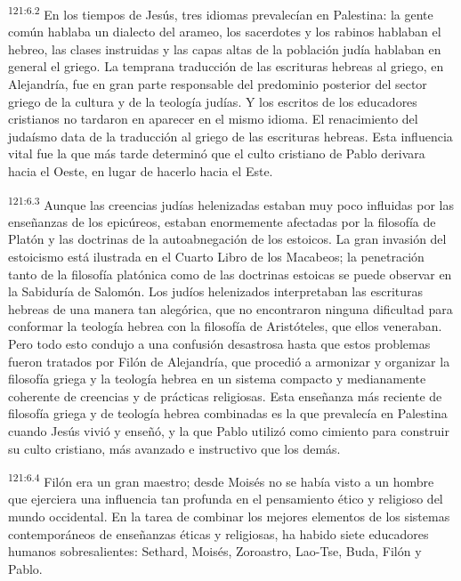 \par 
\textsuperscript{121:6.2} En los tiempos de Jesús, tres idiomas prevalecían en Palestina: la gente común hablaba un dialecto del arameo, los sacerdotes y los rabinos hablaban el hebreo, las clases instruidas y las capas altas de la población judía hablaban en general el griego. La temprana traducción de las escrituras hebreas al griego, en Alejandría, fue en gran parte responsable del predominio posterior del sector griego de la cultura y de la teología judías. Y los escritos de los educadores cristianos no tardaron en aparecer en el mismo idioma. El renacimiento del judaísmo data de la traducción al griego de las escrituras hebreas. Esta influencia vital fue la que más tarde determinó que el culto cristiano de Pablo derivara hacia el Oeste, en lugar de hacerlo hacia el Este.

\par 
\textsuperscript{121:6.3} Aunque las creencias judías helenizadas estaban muy poco influidas por las enseñanzas de los epicúreos, estaban enormemente afectadas por la filosofía de Platón y las doctrinas de la autoabnegación de los estoicos. La gran invasión del estoicismo está ilustrada en el Cuarto Libro de los Macabeos; la penetración tanto de la filosofía platónica como de las doctrinas estoicas se puede observar en la Sabiduría de Salomón. Los judíos helenizados interpretaban las escrituras hebreas de una manera tan alegórica, que no encontraron ninguna dificultad para conformar la teología hebrea con la filosofía de Aristóteles, que ellos veneraban. Pero todo esto condujo a una confusión desastrosa hasta que estos problemas fueron tratados por Filón de Alejandría, que procedió a armonizar y organizar la filosofía griega y la teología hebrea en un sistema compacto y medianamente coherente de creencias y de prácticas religiosas. Esta enseñanza más reciente de filosofía griega y de teología hebrea combinadas es la que prevalecía en Palestina cuando Jesús vivió y enseñó, y la que Pablo utilizó como cimiento para construir su culto cristiano, más avanzado e instructivo que los demás.

\par 
\textsuperscript{121:6.4} Filón era un gran maestro; desde Moisés no se había visto a un hombre que ejerciera una influencia tan profunda en el pensamiento ético y religioso del mundo occidental. En la tarea de combinar los mejores elementos de los sistemas contemporáneos de enseñanzas éticas y religiosas, ha habido siete educadores humanos sobresalientes: Sethard, Moisés, Zoroastro, Lao-Tse, Buda, Filón y Pablo.


